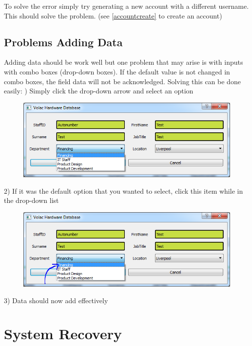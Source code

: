 To solve the error simply try generating a new account with a different username. This should solve the problem. (see \ref{accountcreate} to create an account)

\subsection{Problems Adding Data}

Adding data should be work well but one problem that may arise is with inputs with combo boxes (drop-down boxes). If the default value is not changed in combo boxes, the field data will not be acknowledged. Solving this can be done easily:
) Simply click the drop-down arrow and select an option

\begin{figure}[H]
    \includegraphics[width=\textwidth]{./Manual/Images/dropdownfix.png}
\end{figure}

2) If it was the default option that you wanted to select, click this item while in the drop-down list

\begin{figure}[H]
    \includegraphics[width=\textwidth]{./Manual/Images/dropdownfix2.png}
\end{figure}


3) Data should now add effectively

\section{System Recovery}

